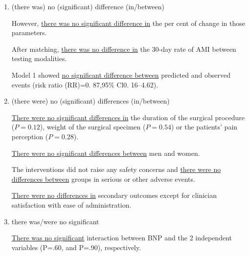 \documentclass{ctexbook}
\begin{document}
    \begin{enumerate}
      \item (there was) no (significant) difference (in/between)
      \begin{eg}{}
        However, \uline{there was no significant difference in} the per cent of change in those parameters. 
      \end{eg}

      \begin{eg}{}
        After matching, \uline{there was no difference in} the 30-day rate of AMI between testing modalities.  
      \end{eg}

      \begin{eg}{}
        Model 1 showed \uline{no significant difference between} predicted and observed events (risk ratio (RR)=0. 87,95\% Cl0. 16--4.62).
      \end{eg}

      \item (there were) no (significant) differences (in/between)
      \begin{eg}{}
        \uline{There were no significant differences in} the duration of the surgical procedure ($P=0.12$), weight of the surgical specimen ($P=0.54$) or the patients' pain perception ($P=0.28$).
      \end{eg}

      \begin{eg}{}
        \uline{There were no significant differences between} men and women. 
      \end{eg}

      \begin{eg}{}
        The interventions did not raise any safety concerns and \uline{there were no differences between} groups in serious or other adverse events.  
      \end{eg}

      \begin{eg}{}
        \uline{There were no differences in} secondary outcomes except for clinician satisfaction with ease of administration.
      \end{eg}

      \item there was/were no significant
      \begin{eg}{}
        \uline{There was no significant} interaction between BNP and the 2 independent variables (P=.60, and P=.90), respectively.        
      \end{eg}


\end{enumerate}
\end{document}
